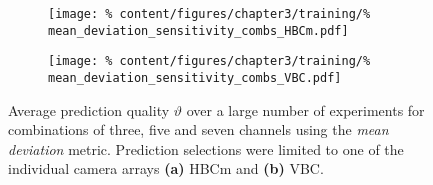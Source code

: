                 \begin{figure}[t]%
                    \centering%
                    \begin{subfigure}{0.47\textwidth}%
                        \texttt{[image: \%
                            content/figures/chapter3/training/\%
                            mean\_deviation\_sensitivity\_combs\_HBCm.pdf]}%
                        \caption{}%
                    \end{subfigure}%
                    \hfill%
                    \begin{subfigure}{0.47\textwidth}%
                        \texttt{[image: \%
                            content/figures/chapter3/training/\%
                            mean\_deviation\_sensitivity\_combs\_VBC.pdf]}%
                        \caption{}%
                    \end{subfigure}%
                    \caption{Average prediction quality $\vartheta$ over a large number of experiments for combinations of three, five and seven channels using the \textit{mean deviation} metric. Prediction selections were limited to one of the individual camera arrays \textbf{(a)} HBCm and \textbf{(b)} VBC.}\label{fig:results_mean_deviation}%
                \end{figure}%
%
